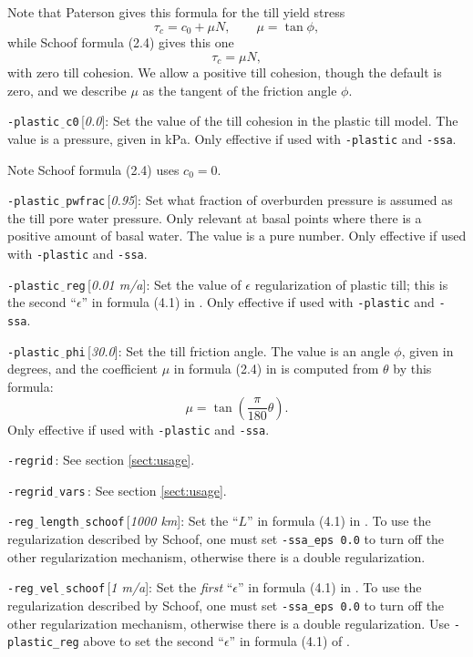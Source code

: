 \documentclass[11pt,final]{amsart}
\newcommand{\eps}{\epsilon}
\newcommand{\rawopt}[1]{\vspace{1mm}\noindent \large\texttt{-#1}\normalsize}
\newcommand{\opt}[1]{\rawopt{#1}\,:\quad}
\newcommand{\optdef}[2]{\rawopt{#1}\,[\textsl{#2}]:\quad}
\newcommand{\und}{$\underline{\,\,\,}$}
\begin{document}
Note that Paterson gives this formula for the till yield stress
	$$\tau_c = c_0 + \mu N, \qquad \mu = \tan \phi,$$
while Schoof \cite{SchoofStream} formula (2.4) gives this one
	$$\tau_c = \mu N,$$
with zero till cohesion.  We allow a positive till cohesion, though the default is zero, and we describe $\mu$ as the tangent of the friction angle $\phi$.

\optdef{plastic\und c0}{0.0}  Set the value of the till cohesion in the plastic till model.  The value is a pressure, given in kPa.  Only effective if used with \verb|-plastic| and \verb|-ssa|.

Note Schoof \cite{SchoofStream} formula (2.4) uses $c_0 = 0$.

\optdef{plastic\und pwfrac}{0.95}  Set what fraction of overburden pressure is assumed as the till pore water pressure.  Only relevant at basal points where there is a positive amount of basal water.  The value is a pure number.  Only effective if used with \verb|-plastic| and \verb|-ssa|.

\optdef{plastic\und reg}{0.01 m/a}    Set the value of $\eps$ regularization of plastic till; this is the second ``$\eps$'' in formula (4.1) in \cite{SchoofStream}.  Only effective if used with \verb|-plastic| and \verb|-ssa|.

\optdef{plastic\und phi}{30.0}  Set the till friction angle.  The value is an angle $\phi$, given in degrees, and the coefficient $\mu$ in formula (2.4) in \cite{SchoofStream} is computed from $\theta$ by this formula:
	$$\mu = \tan\left(\frac{\pi}{180} \theta\right).$$
Only effective if used with \verb|-plastic| and \verb|-ssa|.

\opt{regrid}  See section \ref{sect:usage}.

\opt{regrid\und vars}  See section \ref{sect:usage}.

\optdef{reg\und length\und schoof}{1000 km}  Set the ``$L$'' in formula (4.1) in \cite{SchoofStream}.  To use the regularization described by Schoof, one must set \verb|-ssa_eps 0.0| to turn off the other regularization mechanism, otherwise there is a double regularization.

\optdef{reg\und vel\und schoof}{1 m/a}  Set the \emph{first} ``$\eps$'' in formula (4.1) in \cite{SchoofStream}.  To use the regularization described by Schoof, one must set \verb|-ssa_eps 0.0| to turn off the other regularization mechanism, otherwise there is a double regularization.  Use \verb|-plastic_reg| above to set the second ``$\eps$'' in formula (4.1) of \cite{SchoofStream}.
\end{document}
